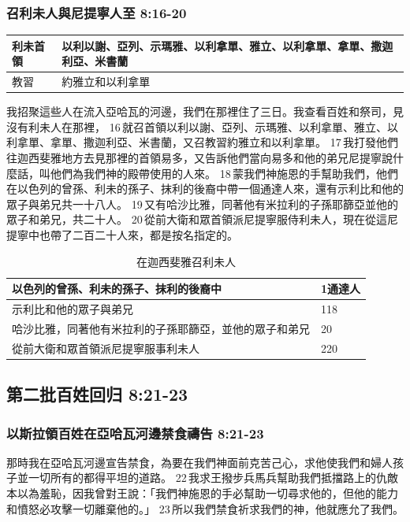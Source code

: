 \subsubsection{召利未人與尼提寧人至 8:16-20}
\begin{table}[H]
\centering 
\begin{tabular}{p{1.5cm}|p{13.5cm}}
\hline
\hline
利未首領&以利以謝、亞列、示瑪雅、以利拿單、雅立、以利拿單、拿單、撒迦利亞、米書蘭 \\\hline
教習&約雅立和以利拿單 \\\hline
\end{tabular}
\end{table}
我招聚這些人在流入亞哈瓦的河邊，我們在那裡住了三日。我查看百姓和祭司，見沒有利未人在那裡， 16 就召首領以利以謝、亞列、示瑪雅、以利拿單、雅立、以利拿單、拿單、撒迦利亞、米書蘭，又召教習約雅立和以利拿單。 17 我打發他們往迦西斐雅地方去見那裡的首領易多，又告訴他們當向易多和他的弟兄尼提寧說什麼話，叫他們為我們神的殿帶使用的人來。 18 蒙我們神施恩的手幫助我們，他們在以色列的曾孫、利未的孫子、抹利的後裔中帶一個通達人來，還有示利比和他的眾子與弟兄共一十八人。 19 又有哈沙比雅，同著他有米拉利的子孫耶篩亞並他的眾子和弟兄，共二十人。 20 從前大衛和眾首領派尼提寧服侍利未人，現在從這尼提寧中也帶了二百二十人來，都是按名指定的。

\begin{table}[H]
\centering 
\begin{tabular}{p{10.5cm}|p{1.5cm}}
\hline
\hline
以色列的曾孫、利未的孫子、抹利的後裔中&1通達人\\\hline
示利比和他的眾子與弟兄&118 \\\hline
哈沙比雅，同著他有米拉利的子孫耶篩亞，並他的眾子和弟兄&20 \\\hline
從前大衛和眾首領派尼提寧服事利未人&220 \\\hline
\end{tabular}
\caption{在迦西斐雅召利未人}
\end{table}


\subsection{第二批百姓回归 8:21-23}
\subsubsection{以斯拉領百姓在亞哈瓦河邊禁食禱告 8:21-23}
那時我在亞哈瓦河邊宣告禁食，為要在我們神面前克苦己心，求他使我們和婦人孩子並一切所有的都得平坦的道路。 
22 我求王撥步兵馬兵幫助我們抵擋路上的仇敵本以為羞恥，因我曾對王說：「我們神施恩的手必幫助一切尋求他的，但他的能力和憤怒必攻擊一切離棄他的。」 
23 所以我們禁食祈求我們的神，他就應允了我們。


